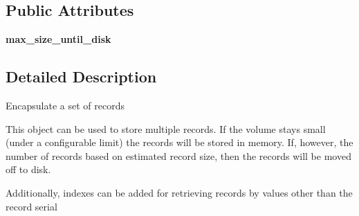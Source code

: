 \subsection*{Public Attributes}
\begin{DoxyCompactItemize}
\item 
\hypertarget{classetl_1_1EtlRecordSet_1_1EtlRecordSet_aca88b5e66d61ff58dfc9c1265dcff8d7}{{\bfseries max\-\_\-size\-\_\-until\-\_\-disk}}\label{classetl_1_1EtlRecordSet_1_1EtlRecordSet_aca88b5e66d61ff58dfc9c1265dcff8d7}

\end{DoxyCompactItemize}


\subsection{Detailed Description}
\begin{DoxyVerb}Encapsulate a set of records

This object can be used to store multiple records.  If the volume stays
small (under a configurable limit) the records will be stored in memory.
If, however, the number of records based on estimated record size, then
the records will be moved off to disk.

Additionally, indexes can be added for retrieving records by values other
than the record serial
\end{DoxyVerb}
 

